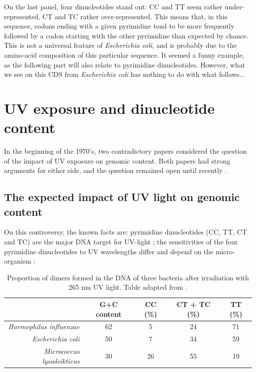 \documentclass{article}
\begin{document}
On the last panel, four dinucleotides stand out: CC and TT seem
rather under-represented, CT and TC rather over-represented. This
means that, in this sequence, codons ending with a given pyrimidine
tend to be more frequently followed by a codon starting with the other
pyrimidine than expected by chance. This is not a universal feature of
\textit{Escherichia coli}, and is probably due to the amino-acid
composition of this particular sequence. It seemed a funny example, as
the following part will also relate to pyrimidine dinucleotides.
However, what we see on this CDS from \textit{Escherichia coli} has
nothing to do with what follows...

\section{UV exposure and dinucleotide content}

In the beginning of the 1970's, two contradictory papers considered
the question of the impact of UV exposure on genomic content. Both
papers had strong arguments for either side, and the question remained
open until recently \cite{UV}.

\subsection{The expected impact of UV light on genomic content}

On this controversy, the known facts are: pyrimidine dinucleotides
(CC, TT, CT and TC) are the major DNA target for UV-light
\cite{Setlow}; the sensitivities of the four pyrimidine dinucleotides
to UV wavelengths differ and depend on the micro-organism
\cite{Setlow}:

\begin{table}[H]
\begin{center}
\begin{tabular}{rcccc}
  \hline \hline
  & G+C content & CC (\%) & CT + TC (\%) & TT (\%)\\
  \hline
  \textit{Haemophilus influenzae} & 62 & 5 & 24 & 71 \\
  \textit{Escherichia coli} & 50 & 7 & 34 & 59 \\
  \textit{Micrococcus lysodeikticus} & 30 & 26 & 55 & 19 \\
  \hline \hline
\end{tabular}
\caption{Proportion of dimers formed in the DNA of three bacteria
  after irradiation with 265 nm UV light. Table adapted from
  \cite{Setlow}.}
\label{sensitivity}
\end{center}
\end{table}
\end{document}
